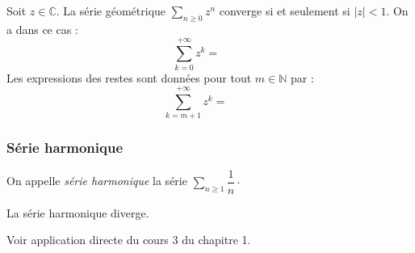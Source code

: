 \documentclass[french,11pt,twoside]{VcCours}
\newcommand{\Sum}[2]{\ensuremath{\textstyle{\sum\limits_{#1}^{#2}}}}
\begin{document}
\begin{Theoreme}{} 
Soit $z \in \mathbb{C}$. La série géométrique $\Sum{n \geq 0}{} z^n$ converge si et seulement si $\vert z \vert <1$. On a dans ce cas : 
$$ \sum_{k=0}^{+ \infty} z^k = \phantom{\frac{1}{1-z}}$$
Les expressions des restes sont données pour tout $m \in \mathbb{N}$ par :
$$ \sum_{k=m+1}^{+ \infty} z^k = \phantom{\frac{z^{m+1}}{1-z}}$$
\end{Theoreme}

\begin{Demonstration}{}  

\vspace{9cm}
\end{Demonstration}

\subsubsection{Série harmonique}

On appelle \emph{série harmonique} la série $\Sum{n \geq 1}{} \dfrac{1}{n} \cdot$

\begin{Theoreme}{} La série harmonique diverge.
\end{Theoreme}

\begin{Demonstration}{} Voir application directe du cours 3 du chapitre 1.
%
\end{Demonstration}
\end{document}
